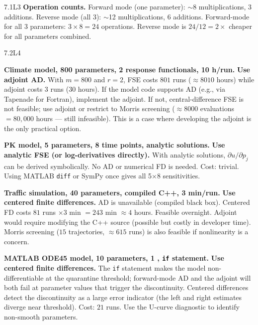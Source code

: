 \begin{solution}{7.1}{L3}
 \textbf{Operation counts.}
Forward mode (one parameter): $\sim$8 multiplications, 3 additions.
Reverse mode (all 3): $\sim$12 multiplications, 6 additions.
Forward-mode for all 3 parameters: $3\times8 = 24$ operations.
Reverse mode is $24/12 = 2\times$ cheaper for all parameters combined.


\end{solution}

\begin{solution}{7.2}{L4}

\solanswer

 \textbf{Climate model, 800 parameters, 2 response functionals, 10 h/run.}
\textbf{Use adjoint AD.} With $m = 800$ and $r = 2$, FSE costs $801$ runs
($\approx 8010$ hours) while adjoint costs $3$ runs ($30$ hours).
If the model code supports AD (e.g., via Tapenade for Fortran),
implement the adjoint. If not, central-difference FSE is not feasible;
use adjoint or restrict to Morris screening ($\approx 8000$ evaluations
$= 80{,}000$ hours — still infeasible). This is a case where
developing the adjoint is the only practical option.

 \textbf{PK model, 5 parameters, 8 time points, analytic solutions.}
\textbf{Use analytic FSE (or log-derivatives directly).}
With analytic solutions, $\partial u/\partial p_j$ can be derived
symbolically. No AD or numerical FD is needed. Cost: trivial.
Using MATLAB \texttt{diff} or SymPy once gives all 5$\times$8 sensitivities.

 \textbf{Traffic simulation, 40 parameters, compiled C++, 3 min/run.}
\textbf{Use centered finite differences.}
AD is unavailable (compiled black box). Centered FD costs $81$ runs
$\times3$ min $= 243$ min $\approx 4$ hours. Feasible overnight.
Adjoint would require modifying the C++ source (possible but costly in developer time).
Morris screening ($15$ trajectories, $\approx 615$ runs) is also feasible
if nonlinearity is a concern.

 \textbf{MATLAB ODE45 model, 10 parameters, 1 \QOI, \texttt{if} statement.}
\textbf{Use centered finite differences.}
The \texttt{if} statement makes the model non-differentiable at the quarantine
threshold; forward-mode AD and the adjoint will both fail at parameter values
that trigger the discontinuity. Centered differences detect the discontinuity
as a large error indicator (the left and right estimates diverge near threshold).
Cost: $21$ runs. Use the U-curve diagnostic to identify non-smooth parameters.


\end{solution}
